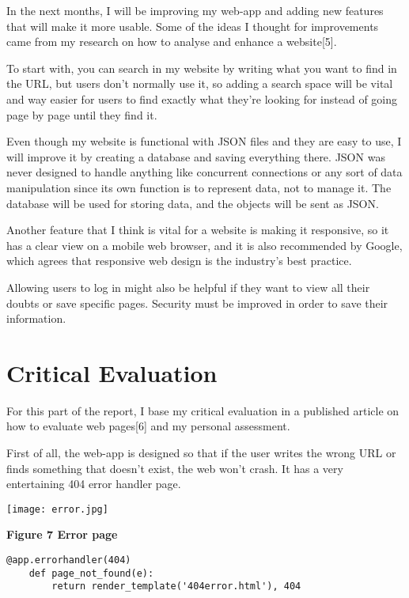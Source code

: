 \documentclass[10pt, a4paper]{article}
\begin{document}
    In the next months, I will be improving my web-app and adding new features that will make it more usable. Some of the ideas I thought for improvements came from my research on how to analyse and enhance a website[5].

    To start with, you can search in my website by writing what you want to find in the URL, but users don't normally use it, so adding a search space will be vital and way easier for users to find exactly what they're looking for instead of going page by page until they find it.

    Even though my website is functional with JSON files and they are easy to use, I will improve it by creating a database and saving everything there. JSON was never designed to handle anything like concurrent connections or any sort of data manipulation since its own function is to represent data, not to manage it. The database will be used for storing data, and the objects will be sent as JSON.

    Another feature that I think is vital for a website is making it responsive, so it has a clear view on a mobile web browser, and it is also recommended by Google, which agrees that responsive web design is the industry's best practice.

    Allowing users to log in might also be helpful if they want to view all their doubts or save specific pages. Security must be improved in order to save their information.

    \section{Critical Evaluation}

    For this part of the report, I base my critical evaluation in a published article on how to evaluate web pages[6] and my personal assessment.

    First of all, the web-app is designed so that if the user writes the wrong URL or finds something that doesn't exist, the web won't crash. It has a very entertaining 404 error handler page.

    \texttt{[image: error.jpg]}

    \textbf{Figure 7 Error page}
    \vspace{2mm}

    \begin{lstlisting}[caption = How error pages are handled]
    @app.errorhandler(404)
    def page_not_found(e):
        return render_template('404error.html'), 404
    \end{lstlisting}
\end{document}
